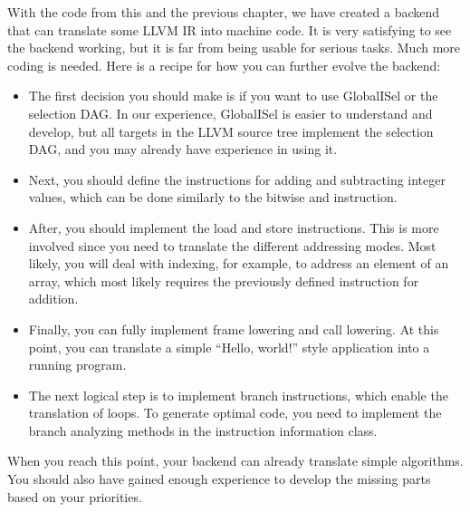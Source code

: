 With the code from this and the previous chapter, we have created a backend that can translate some LLVM IR into machine code. It is very satisfying to see the backend working, but it is far from being usable for serious tasks. Much more coding is needed. Here is a recipe for how you can further evolve the backend:

\begin{itemize}
\item
The first decision you should make is if you want to use GlobalISel or the selection DAG. In our experience, GlobalISel is easier to understand and develop, but all targets in the LLVM source tree implement the selection DAG, and you may already have experience in using it.

\item
Next, you should define the instructions for adding and subtracting integer values, which can be done similarly to the bitwise and instruction.

\item
After, you should implement the load and store instructions. This is more involved since you need to translate the different addressing modes. Most likely, you will deal with indexing, for example, to address an element of an array, which most likely requires the previously defined instruction for addition.

\item
Finally, you can fully implement frame lowering and call lowering. At this point, you can translate a simple “Hello, world!” style application into a running program.

\item
The next logical step is to implement branch instructions, which enable the translation of loops. To generate optimal code, you need to implement the branch analyzing methods in the instruction information class.
\end{itemize}

When you reach this point, your backend can already translate simple algorithms. You should also have gained enough experience to develop the missing parts based on your priorities.

















